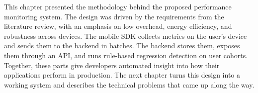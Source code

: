 This chapter presented the methodology behind the proposed performance monitoring system. The design was driven by the requirements from the literature review, with an emphasis on low overhead, energy efficiency, and robustness across devices. The mobile SDK collects metrics on the user's device and sends them to the backend in batches. The backend stores them, exposes them through an API, and runs rule-based regression detection on user cohorts. Together, these parts give developers automated insight into how their applications perform in production. The next chapter turns this design into a working system and describes the technical problems that came up along the way.
